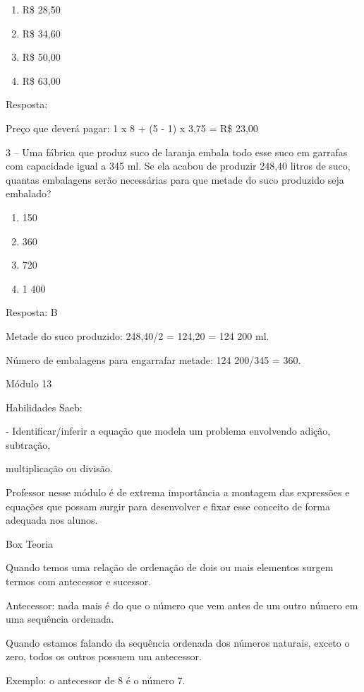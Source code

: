 \begin{enumerate}
\def\labelenumi{\alph{enumi})}
\item
  R\$ 28,50
\item
  R\$ 34,60
\item
  R\$ 50,00
\item
  R\$ 63,00
\end{enumerate}

Resposta:

Preço que deverá pagar: 1 x 8 + (5 - 1) x 3,75 = R\$ 23,00

3 -- Uma fábrica que produz suco de laranja embala todo esse suco em
garrafas com capacidade igual a 345 ml. Se ela acabou de produzir 248,40
litros de suco, quantas embalagens serão necessárias para que metade do
suco produzido seja embalado?

\begin{enumerate}
\def\labelenumi{\alph{enumi})}
\item
  150
\item
  360
\item
  720
\item
  1 400
\end{enumerate}

Resposta: B

Metade do suco produzido: 248,40/2 = 124,20 = 124 200 ml.

Número de embalagens para engarrafar metade: 124 200/345 = 360.

Módulo 13

Habilidades Saeb:

- Identificar/inferir a equação que modela um problema envolvendo
adição, subtração,

multiplicação ou divisão.

Professor nesse módulo é de extrema importância a montagem das
expressões e equações que possam surgir para desenvolver e fixar esse
conceito de forma adequada nos alunos.

Box Teoria

Quando temos uma relação de ordenação de dois ou mais elementos surgem
termos com antecessor e sucessor.

Antecessor: nada mais é do que o número que vem antes de um outro número
em uma sequência ordenada.

Quando estamos falando da sequência ordenada dos números naturais,
exceto o zero, todos os outros possuem um antecessor.

Exemplo: o antecessor de 8 é o número 7.

